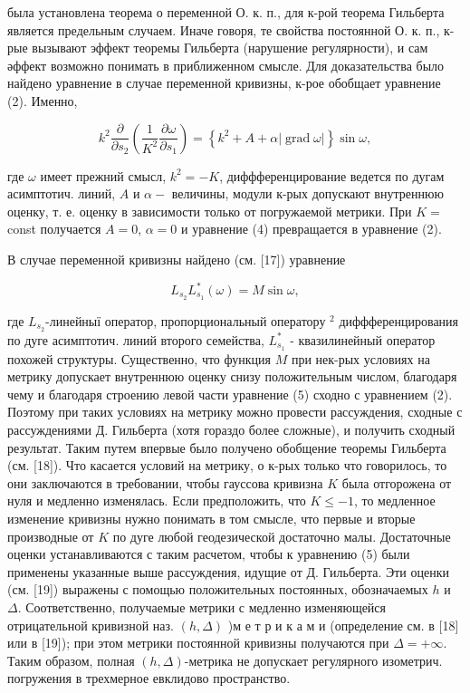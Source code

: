 \documentclass[10pt]{article}
\begin{document}
была установлена теорема о переменной О. к. п., для к-рой теорема Гильберта является предельным случаем. Иначе говоря, те свойства постоянной О. к. п., к-рые вызывают эффект теоремы Гильберта (нарушение регулярности), и сам әффект возможно понимать в приближенном смысле. Для доказательства было найдено уравнение в случае переменной кривизны, к-рое обобщает уравнение (2). Именно,

\[
k^{2} \frac{\partial}{\partial s_{2}}\left(\frac{1}{K^{2}} \frac{\partial \omega}{\partial s_{1}}\right)=\left\{k^{2}+A+\alpha|\operatorname{grad} \omega|\right\} \sin \omega,
\]

где $\omega$ имеет прежний смысл, $k^{2}=-K$, диффференцирование ведется по дугам асимптотич. линий, $A$ и $\alpha-$ величины, модули к-рых допускают внутреннюю оценку, т. е. оценку в зависимости только от погружаемой метрики. При $K=$ const получается $A=0$, $\alpha=0$ и уравнение (4) превращается в уравнение (2).

В случае переменной кривизны найдено (см. [17]) уравнение

\[
L_{s_{2}} L_{s_{1}}^{*}(\omega)=M \sin \omega,
\]

где $L_{s_{2}}$-линейныї оператор, пропорциональный оператору $^{2}$ диффференцирования по дуге асимптотич. линий второго семейства, $L_{s_{1}}^{*}$ - квазилинейный оператор похожей структуры. Существенно, что функция $M$ при нек-рых условиях на метрику допускает внутреннюю оценку снизу положительным числом, благодаря чему и благодаря строению левой части уравнение (5) сходно с уравнением (2). Поэтому при таких условиях на метрику можно провести рассуждения, сходные с рассуждениями Д. Гильберта (хотя гораздо более сложные), и получить сходный результат. Таким путем впервые было получено обобщение теоремы Гильберта (см. [18]). Что касается условий на метрику, о к-рых только что говорилось, то они заключаются в требовании, чтобы гауссова кривизна $K$ была отгорожена от нуля и медленно изменялась. Если предположить, что $K \leqslant-1$, то медленное изменение кривизны нужно понимать в том смысле, что первые и вторые производные от $K$ по дуге любой геодезической достаточно малы. Достаточные оценки устанавливаются с таким расчетом, чтобы к уравнению (5) были применены указанные выше рассуждения, идущие от Д. Гильберта. Эти оценки (см. [19]) выражены с помощью положительных постоянных, обозначаемых $h$ и $\Delta$. Соответственно, получаемые метрики с медленно изменяющейся отрицательной кривизной наз. $(h, \Delta)$ )м е т р и к а м и (определение см. в [18] или в [19]); при этом метрики постоянной кривизны получаются при $\Delta=+\infty$. Таким образом, полная $(h, \Delta)$-метрика не допускает регулярного изометрич. погружения в трехмерное евклидово пространство.
\end{document}
